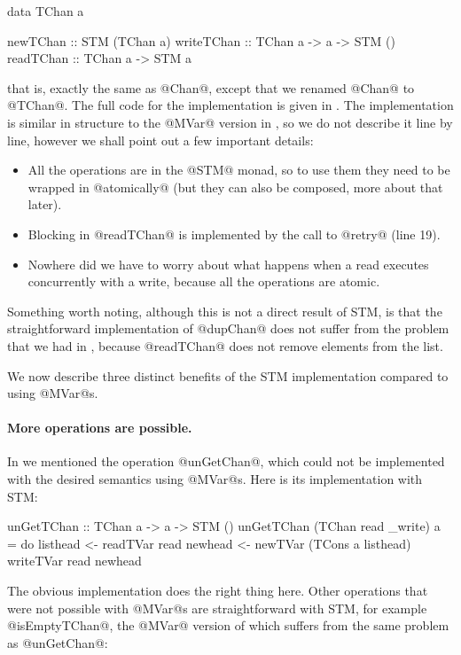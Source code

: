 \begin{haskell}
data TChan a

newTChan   :: STM (TChan a)
writeTChan :: TChan a -> a -> STM ()
readTChan  :: TChan a -> STM a
\end{haskell}

\noindent that is, exactly the same as @Chan@, except that we renamed
@Chan@ to @TChan@.  The full code for the implementation is given in
.  The implementation is similar in structure to the
@MVar@ version in , so we do not describe it line by
line, however we shall point out a few important details:

\begin{itemize}
\item All the operations are in the @STM@ monad, so to use them they
  need to be wrapped in @atomically@ (but they can also be composed,
  more about that later).
\item Blocking in @readTChan@ is implemented by the call to @retry@
  (line 19).
\item Nowhere did we have to worry about what happens when a read
  executes concurrently with a write, because all the operations are
  atomic.
\end{itemize}

Something worth noting, although this is not a direct result of STM,
is that the straightforward implementation of @dupChan@ does not
suffer from the problem that we had in , because
@readTChan@ does not remove elements from the list.

We now describe three distinct benefits of the STM implementation
compared to using @MVar@s.

\paragraph{More operations are possible.} In  we
mentioned the operation @unGetChan@, which could not be implemented
with the desired semantics using @MVar@s.  Here is its implementation
with STM:

\begin{haskell}
unGetTChan :: TChan a -> a -> STM ()
unGetTChan (TChan read _write) a = do
   listhead <- readTVar read
   newhead <- newTVar (TCons a listhead)
   writeTVar read newhead
\end{haskell}

\noindent The obvious implementation does the right thing here.  Other
operations that were not possible with @MVar@s are straightforward
with STM, for example @isEmptyTChan@, the @MVar@ version of which
suffers from the same problem as @unGetChan@:

